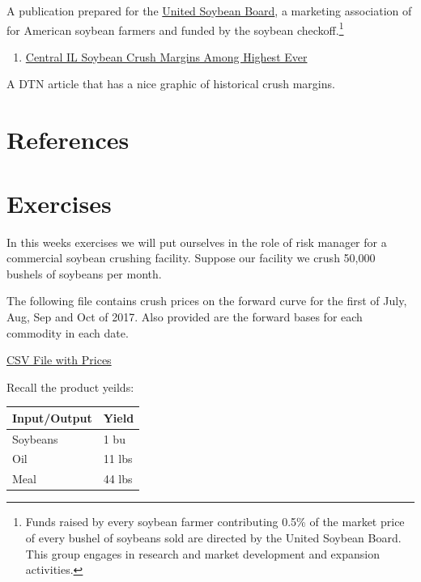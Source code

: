 \documentclass[
]{book}
\providecommand{\tightlist}{%
  \setlength{\itemsep}{0pt}\setlength{\parskip}{0pt}}
\begin{document}
A publication prepared for the \href{http://unitedsoybean.org/}{United Soybean Board}, a marketing association of for American soybean farmers and funded by the soybean checkoff.\footnote{Funds raised by every soybean farmer contributing 0.5\% of the market price of every bushel of soybeans sold are directed by the United Soybean Board. This group engages in research and market development and expansion activities.}

\begin{enumerate}
\def\labelenumi{\arabic{enumi}.}
\setcounter{enumi}{1}
\tightlist
\item
  \href{http://www.dtnprogressivefarmer.com/dtnag/common/link.do;jsessionid=CA98693F5E3C9EF37EC1F032464A6388.agfreejvm1?symbolicName=/ag/blogs/template1\&blogHandle=agfundamental\&blogEntryId=8a82c0bc372e8fba0137a8324dd704cf}{Central IL Soybean Crush Margins Among Highest Ever}
\end{enumerate}

A DTN article that has a nice graphic of historical crush margins.

\hypertarget{references-1}{%
\section{References}\label{references-1}}

\hypertarget{exercises-7}{%
\section{Exercises}\label{exercises-7}}

In this weeks exercises we will put ourselves in the role of risk manager for a commercial soybean crushing facility. Suppose our facility we crush 50,000 bushels of soybeans per month.

The following file contains crush prices on the forward curve for the first of July, Aug, Sep and Oct of 2017. Also provided are the forward bases for each commodity in each date.

\href{Excel-files/soy-crush-exercise.csv}{CSV File with Prices}

Recall the product yeilds:

\begin{longtable}[]{@{}ll@{}}
\toprule
Input/Output & Yield\tabularnewline
\midrule
\endhead
Soybeans & 1 bu\tabularnewline
Oil & 11 lbs\tabularnewline
Meal & 44 lbs\tabularnewline
\bottomrule
\end{longtable}
\end{document}
